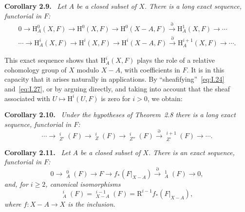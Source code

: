 \documentclass[11pt]{article}
\newcommand{\uH}{\mathop{\underline{\mathrm H}}\nolimits}
\newcommand{\restr}[2]{#1\vert_{#2}}
\newenvironment{sgastatement}[1]
  {\par\addvspace{0.8\baselineskip}\noindent\textbf{#1.}\ \itshape}
  {\par\addvspace{0.4\baselineskip}}
\begin{document}
\begin{sgastatement}{Corollary 2.9}
Let $A$ be a closed subset of $X$. There is a long exact sequence,
functorial in $F$:
\begin{equation}
\begin{gathered}
  0\longrightarrow \mathrm H_A^0(X,F)
  \longrightarrow \mathrm H^0(X,F)
  \longrightarrow \mathrm H^0(X-A,F)
  \xrightarrow{\partial} \mathrm H_A^1(X,F)\longrightarrow\cdots \\
  \cdots\longrightarrow \mathrm H_A^i(X,F)
  \longrightarrow \mathrm H^i(X,F)
  \longrightarrow \mathrm H^i(X-A,F)
  \xrightarrow{\partial} \mathrm H_A^{i+1}(X,F)
  \longrightarrow\cdots .
\end{gathered}
\tag{27}\label{eq:I.27}
\end{equation}
\end{sgastatement}

This exact sequence shows that $\mathrm H_A^i(X,F)$ plays the role of a
relative cohomology group of $X$ modulo $X-A$, with coefficients in $F$. It
is in this capacity that it arises naturally in applications. By
``sheafifying''~\eqref{eq:I.24} and~\eqref{eq:I.27}, or by arguing directly,
and taking into account that the sheaf associated with
$U\mapsto\mathrm H^i(U,F)$ is zero for $i>0$, we obtain:

\begin{sgastatement}{Corollary 2.10}
Under the hypotheses of Theorem~2.8 there is a long exact sequence,
functorial in $F$:
\begin{equation}
  \cdots\longrightarrow \uH_{Z'}^i(F)
  \longrightarrow \uH_Z^i(F)
  \longrightarrow \uH_{Z''}^i(F)
  \xrightarrow{\partial}\uH_{Z'}^{i+1}(F)
  \longrightarrow\cdots .
  \tag{24 bis}\label{eq:I.24bis}
\end{equation}
\end{sgastatement}

\begin{sgastatement}{Corollary 2.11}
Let $A$ be a closed subset of $X$. There is an exact sequence, functorial in
$F$:
\begin{equation}
  0\longrightarrow\uH_A^0(F)
  \longrightarrow F
  \longrightarrow f_*(\restr{F}{X-A})
  \xrightarrow{\partial}\uH_A^1(F)
  \longrightarrow0,
  \tag{28}\label{eq:I.28}
\end{equation}
and, for $i\ge2$, canonical isomorphisms
\begin{equation}
  \uH_A^i(F)
  =\uH_{X-A}^{i-1}(F)
  =\mathrm R^{i-1}f_*(\restr{F}{X-A}),
  \tag{29}\label{eq:I.29}
\end{equation}
where $f\colon X-A\to X$ is the inclusion.
\end{sgastatement}
\end{document}
